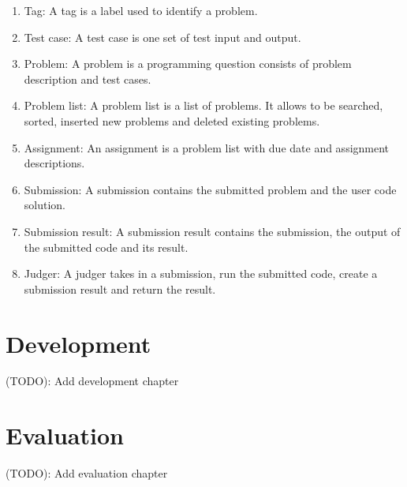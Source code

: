 \documentclass[a4paper]{report}
\begin{document}
\begin{enumerate}
      \item Tag: A tag is a label used to identify a problem.
      \item Test case: A test case is one set of test input and output.
      \item Problem: A problem is a programming question consists of problem description and test cases.
      \item Problem list: A problem list is a list of problems. It allows to be searched, sorted, inserted new problems and deleted existing problems.
      \item Assignment: An assignment is a problem list with due date and assignment descriptions.
      \item Submission: A submission contains the submitted problem and the user code solution.
      \item Submission result: A submission result contains the submission, the output of the submitted code and its result.
      \item Judger: A judger takes in a submission, run the submitted code, create a submission result and return the result.
\end{enumerate}


\chapter{Development}

(TODO): Add development chapter

\chapter{Evaluation}

(TODO): Add evaluation chapter
\end{document}

